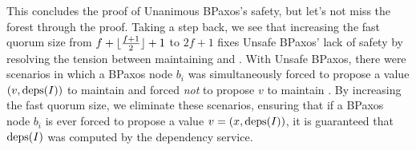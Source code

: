 This concludes the proof of Unanimous BPaxos's safety, but let's not miss the
forest through the proof. Taking a step back, we see that increasing the fast
quorum size from $f + \lfloor\frac{f + 1}{2}\rfloor + 1$ to $2f + 1$ fixes Unsafe BPaxos' lack of
safety by resolving the tension between maintaining 
and .  With Unsafe BPaxos, there were scenarios in
which a BPaxos node $b_i$ was simultaneously forced to propose a value $(v,
\text{deps}(I))$ to maintain  and forced \emph{not} to
propose $v$ to maintain .  By increasing the fast
quorum size, we eliminate these scenarios, ensuring that if a BPaxos node $b_i$
is ever forced to propose a value $v = (x, \text{deps}(I))$, it is guaranteed that
$\text{deps}(I)$ was computed by the dependency service.
